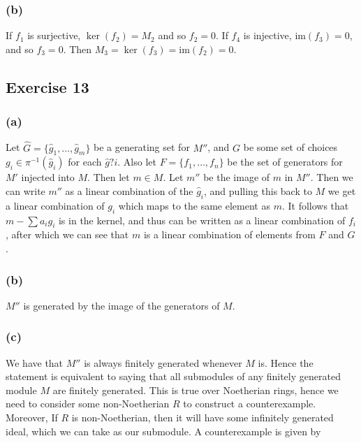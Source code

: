 \documentclass{article}
\theoremstyle{definition}
\newcommand{\im}{\text{im}}
\begin{document}
\subsubsection*{(b)}

If $f_1$ is surjective, $\ker(f_2) = M_2$ and so $f_2 = 0$. If $f_4$ is
injective, $\im(f_3) = 0$, and so $f_3 = 0$. Then $M_3 = \ker(f_3) = \im(f_2) =
0$.

\subsection*{Exercise 13}

\subsubsection*{(a)}

Let $\hat{G} = \{\hat{g}_1, \ldots, \hat{g}_m\}$ be a generating set for $M''$,
and $G$ be some set of choices $g_i \in \pi^{-1}(\hat{g}_i)$ for each
$\hat{g}?i$. Also let $F = \{f_1, \ldots, f_n\}$ be the set of generators for
$M'$ injected into $M$. Then let $m \in M$. Let $m''$ be the image of $m$ in
$M''$. Then we can write $m''$ as a linear combination of the $\hat{g}_i$, and
pulling this back to $M$ we get a linear combination of $g_i$ which maps to the
same element as $m$. It follows that $m - \sum a_i g_i$ is in the kernel, and
thus can be written as a linear combination of $f_i$, after which we can see
that $m$ is a linear combination of elements from $F$ and $G$. \\

\subsubsection*{(b)}

$M''$ is generated by the image of the generators of $M$.

\subsubsection*{(c)}

We have that $M''$ is always finitely generated whenever $M$ is. Hence the
statement is equivalent to saying that all submodules of any finitely generated
module $M$ are finitely generated. This is true over Noetherian rings, hence we
need to consider some non-Noetherian $R$ to construct a counterexample. Moreover,
If $R$ is non-Noetherian, then it will have some infinitely generated ideal, which 
we can take as our submodule. A counterexample is given by
\end{document}
